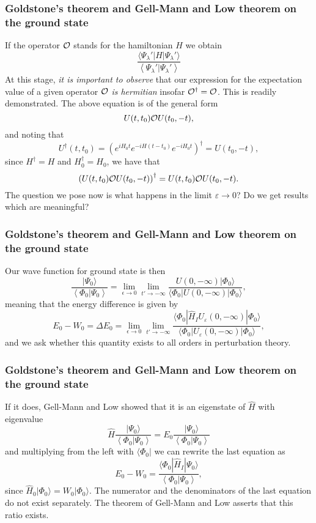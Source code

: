 \documentclass[compress]{beamer}
\newcommand*{\ket}[1]{|#1\rangle}
\newcommand*{\bra}[1]{\langle#1|}
\begin{document}
\frame
{
\frametitle{Goldstone's theorem and Gell-Mann and Low theorem on the ground state}
\begin{small}
{\scriptsize
If the operator ${\cal O}$ stands for the hamiltonian $H$ we obtain
\[
    {\displaystyle  \frac{\bra{\Psi_{\lambda}'}H\ket{\Psi_{\lambda}'} }
   { \left\langle\Psi_{\lambda}' | \Psi_{\lambda}' \right\rangle} }
\]
At this stage, {\em it is important to observe} that our 
expression for the expectation value of a given operator ${\cal O}$
{\em is hermitian} insofar ${\cal O}^{\dagger}={\cal O}$. This is readily 
demonstrated. The above equation is of the general form
\[
U(t,t_0){\cal O}U(t_0,-t),
\]
and noting that 
\[
   U^{\dagger}(t,t_0)=
   \left({\displaystyle e^{iH_0t}e^{-iH(t-t_0)}e^{-iH_0t}}\right)^{\dagger}
   =U(t_0,-t),
\]
since $H^{\dagger}=H$ and $H_0^{\dagger}=H_0$, we have that
\[
    \left(U(t,t_0){\cal O}U(t_0,-t)\right)^{\dagger}
    =U(t,t_0){\cal O}U(t_0,-t).
\]
The question we pose now is what happens in the limit $\varepsilon\rightarrow 0$?
Do we get results which are meaningful?
}
\end{small}
}
\frame
{
\frametitle{Goldstone's theorem and Gell-Mann and Low theorem on the ground state}
\begin{small}
{\scriptsize
Our wave function for ground state is then
\[
        \frac{\ket{\Psi_0}}{\left\langle\Phi_0 | \Psi_0 \right\rangle}=
    \lim_{\epsilon \rightarrow 0}
   \lim_{t'\rightarrow -\infty}
   \frac{U(0,-\infty )\ket{\Phi_0} }
   { \bra{\Phi_0} U(0,-\infty )\ket{\Phi_0} },
\]
meaning that the energy difference is given by
\[
E_0-W_0=\Delta E_0= \lim_{\epsilon \rightarrow 0}
   \lim_{t'\rightarrow -\infty}
   \frac{\bra{\Phi_0}\hat{H}_IU_{\varepsilon}(0,-\infty )\ket{\Phi_0} }
   { \bra{\Phi_0} U_{\varepsilon}(0,-\infty )\ket{\Phi_0} },
\]
and we ask whether this quantity exists to all orders in perturbation theory.
}
\end{small}
}
\frame
{
\frametitle{Goldstone's theorem and Gell-Mann and Low theorem on the ground state}
\begin{small}
{\scriptsize
If it does, Gell-Mann and Low showed that it is an eigenstate of $\hat{H}$ with eigenvalue
\[
 \hat{H}\frac{\ket{\Psi_0}}{\left\langle\Phi_0 | \Psi_0 \right\rangle}= E_0\frac{\ket{\Psi_0}}{\left\langle\Phi_0 | \Psi_0 \right\rangle}
\]
and multiplying from the left with $\langle \Phi_0|$ we can rewrite the last equation
as
\[
E_0-W_0=\frac{\langle \Phi_0|\hat{H}_I\ket{\Psi_0}}{\left\langle\Phi_0 | \Psi_0 \right\rangle},
\]
since $\hat{H}_0|\Phi_0\rangle = W_0|\Phi_0\rangle$. The numerator and the denominators of the last equation do not exist separately. The theorem of Gell-Mann and Low asserts that this ratio exists. 
}
\end{small}
}
\end{document}
